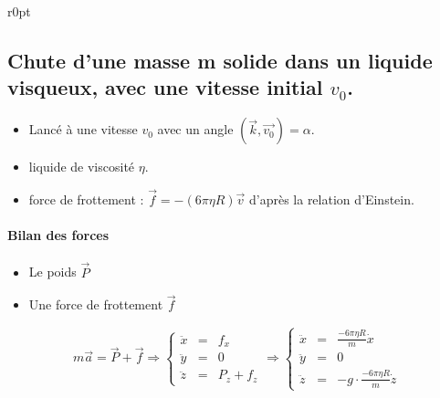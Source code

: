 \begin{wrapfigure}[0]{r}{0pt}
\end{wrapfigure}

\subsection{Chute d'une masse m solide dans un liquide visqueux, avec une vitesse initial $v_0$.}
\begin{itemize}
	\item Lancé à une vitesse $v_0$ avec un angle $(\vec{k}, \vec{v_0}) = \alpha$.
	\item liquide de viscosité  $\eta$.
	\item force de frottement : $\vec{f} = -(6\pi\eta R) \vec{v}$ d'après la relation d'Einstein.
\end{itemize}

\paragraph{Bilan des forces}
\begin{itemize}
	\item Le poids $\vec{P}$
	\item Une force de frottement $\vec{f}$
\end{itemize}

\[
	m\vec{a} = \vec{P} + \vec{f} \Rightarrow
	\left\{\begin{array}{rcl}
			\ddot{x} &=& f_x \\
			\ddot{y} &=& 0 \\
			\ddot{z} &=& P_z + f_z
\end{array}\right. 
\Rightarrow
\left\{
\begin{array}{rclr}
	\ddot{x} &=& \frac{-6\pi\eta R}{m} \dot{x} \\
	\ddot{y} &=& 0 \\
	\ddot{z} &=& -g \cdot \frac{-6\pi\eta R}{m} \dot{z}
\end{array}\right.\]

